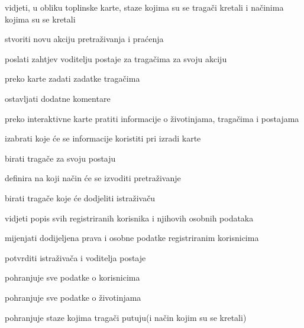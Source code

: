 \begin{packed_enum}
\begin{packed_enum}
				\end{packed_enum}

				\item  {}
				
				\begin{packed_enum}
					\item vidjeti, u obliku toplinske karte, staze kojima su se tragači kretali i načinima kojima su se kretali
					\item stvoriti novu akciju pretraživanja i praćenja
					\item poslati zahtjev voditelju postaje za tragačima za svoju akciju
					\item preko karte zadati zadatke tragačima
					\item ostavljati dodatne komentare
					\item preko interaktivne karte pratiti informacije o životinjama, tragačima i postajama
					\item izabrati koje će se informacije koristiti pri izradi karte
				\end{packed_enum}

				\item  {}
				
				\begin{packed_enum}
					\item birati tragače za svoju postaju
					\item definira na koji način će se izvoditi pretraživanje
					\item birati tragače koje će dodjeliti istraživaču
				\end{packed_enum}

				\item  {}
				
				\begin{packed_enum}
					\item vidjeti popis svih registriranih korisnika i njihovih osobnih podataka
					\item mijenjati dodijeljena prava i osobne podatke registriranim korisnicima
					\item potvrditi istraživača i voditelja postaje
				\end{packed_enum}

				\item  {}
				
				\begin{packed_enum}
					\item pohranjuje sve podatke o korisnicima 
					\item pohranjuje sve podatke o životinjama
					\item pohranjuje staze kojima tragači putuju(i način kojim su se kretali)
				\end{packed_enum}


			\end{packed_enum}
			
